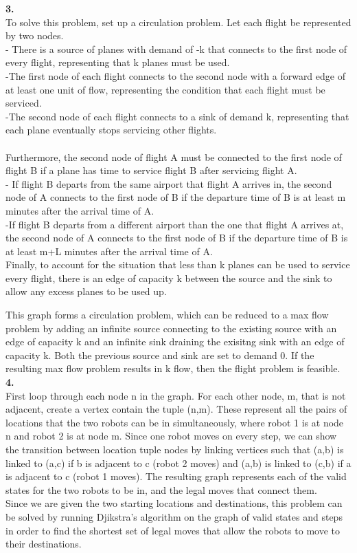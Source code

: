 \documentclass[a4paper,12pt]{article}
\begin{document}
\noindent \textbf{3.}\\
To solve this problem, set up a circulation problem. Let each flight be represented by two nodes. \\
- There is a source of planes with demand of -k that connects to the first node of every flight, representing that k planes must be used.\\
-The first node of each flight connects to the second node with a forward edge of at least one unit of flow, representing the condition that each flight must be serviced. \\
-The second node of each flight connects to a sink of demand k, representing that each plane eventually stops servicing other flights. \\\\
Furthermore, the second node of flight A must be connected to the first node of flight B if a plane has time to service flight B  after servicing flight A. \\
- If flight B departs from the same airport that flight A arrives in, the second node of A connects to the first node of B if the departure time of B is at least m minutes after the arrival time of A. \\
-If flight B departs from a different airport than the one that flight A arrives at, the second node of A connects to the first node of B if the departure time of B is at least m+L minutes after the arrival time of A. \\

Finally, to account for the situation that less than k planes can be used to service every flight, there is an edge of capacity k between the source and the sink to allow any excess planes to be used up. 

This graph forms a circulation problem, which can be reduced to a max flow problem by adding an infinite source connecting to the existing source with an edge of capacity k and an infinite sink draining the exisitng sink with an edge of capacity k. Both the previous source and sink are set to demand 0. If the resulting max flow problem results in k flow, then the flight problem is feasible. \\

\noindent \textbf{4.}\\
First loop through each node n in the graph. For each other node, m, that is not adjacent, create a vertex contain the tuple (n,m). These represent all the pairs of locations that the two robots can be in simultaneously, where robot 1 is at node n and robot 2 is at node m. Since one robot moves on every step, we can show the transition between location tuple nodes by linking vertices such that (a,b) is linked to (a,c) if b is adjacent to c (robot 2 moves) and (a,b) is linked to (c,b) if a is adjacent to c (robot 1 moves). The resulting graph represents each of the valid states for the two robots to be in, and the legal moves that connect them. \\
Since we are given the two starting locations and destinations, this problem can be solved by running Djikstra's algorithm on the graph of valid states and steps in order to find the shortest set of legal moves that allow the robots to move to their destinations. 
\end{document}
